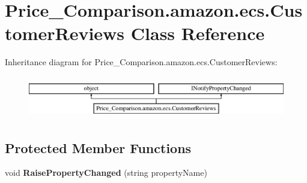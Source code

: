 \hypertarget{class_price___comparison_1_1amazon_1_1ecs_1_1_customer_reviews}{\section{Price\-\_\-\-Comparison.\-amazon.\-ecs.\-Customer\-Reviews Class Reference}
\label{class_price___comparison_1_1amazon_1_1ecs_1_1_customer_reviews}
}


 


Inheritance diagram for Price\-\_\-\-Comparison.\-amazon.\-ecs.\-Customer\-Reviews\-:\begin{figure}[H]
\begin{center}
\leavevmode
\includegraphics[height=1.872910cm]{class_price___comparison_1_1amazon_1_1ecs_1_1_customer_reviews}
\end{center}
\end{figure}
\subsection*{Protected Member Functions}
\begin{DoxyCompactItemize}
\item 
\hypertarget{class_price___comparison_1_1amazon_1_1ecs_1_1_customer_reviews_ab242729e8c4287876b2986b3d834956f}{void {\bfseries Raise\-Property\-Changed} (string property\-Name)}\label{class_price___comparison_1_1amazon_1_1ecs_1_1_customer_reviews_ab242729e8c4287876b2986b3d834956f}

\end{DoxyCompactItemize}

